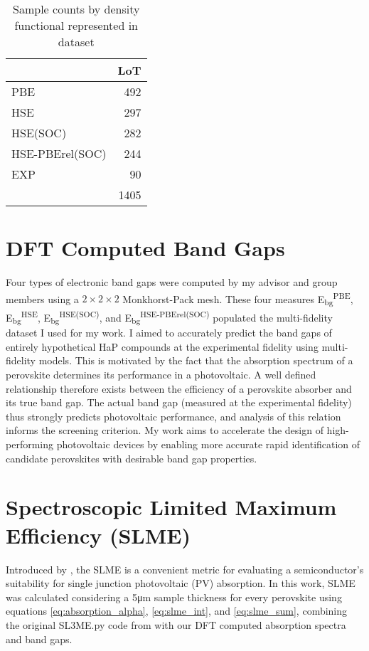  
\begin{table}[htbp]
\caption{\label{tbl:LoTs} Sample counts by density functional represented in dataset}
\centering
\begin{tabular}{lr}
 & LoT\\[0pt]
\hline
PBE & 492\\[0pt]
HSE & 297\\[0pt]
HSE(SOC) & 282\\[0pt]
HSE-PBErel(SOC) & 244\\[0pt]
EXP & 90\\[0pt]
\hline
 & 1405\\[0pt]
\end{tabular}
\end{table}

\section{DFT Computed Band Gaps}
\label{sec:org7daa035}
Four types of electronic band gaps were computed by my advisor and group members using a \(2\times{}2\times{}2\) Monkhorst-Pack mesh.
These four measures E\textsubscript{bg}\textsuperscript{PBE}, E\textsubscript{bg}\textsuperscript{HSE}, E\textsubscript{bg}\textsuperscript{HSE(SOC)}, and E\textsubscript{bg}\textsuperscript{HSE-PBErel(SOC)} populated the multi-fidelity dataset I used for my work.
I aimed to accurately predict the band gaps of entirely hypothetical HaP compounds at the experimental fidelity using multi-fidelity models. 
This is motivated by the fact that the absorption spectrum of a perovskite determines its performance in a photovoltaic.
\autocite{mannodi-kanakkithodi-2019-compr-comput}
A well defined relationship therefore exists between the efficiency of a perovskite absorber and its true band gap.
\autocite{yu-2012-ident-poten}
The actual band gap (measured at the experimental fidelity) thus strongly predicts photovoltaic performance, and analysis of this relation informs the screening criterion.
My work aims to accelerate the design of high-performing photovoltaic devices by enabling more accurate rapid identification of candidate perovskites with desirable band gap properties.

\section{Spectroscopic Limited Maximum Efficiency (SLME)}
\label{sec:org67dad11}
Introduced by \textcite{yu-2012-ident-poten}, the SLME is a convenient metric for evaluating a semiconductor's suitability for single junction photovoltaic (PV) absorption.
In this work, SLME was calculated considering a 5\unit{\micro\meter} sample thickness for every perovskite using equations \ref{eq:absorption_alpha}, \ref{eq:slme_int}, and \ref{eq:slme_sum}, combining the original SL3ME.py code from \textcite{yu-2012-ident-poten} with our DFT computed absorption spectra and band gaps.

